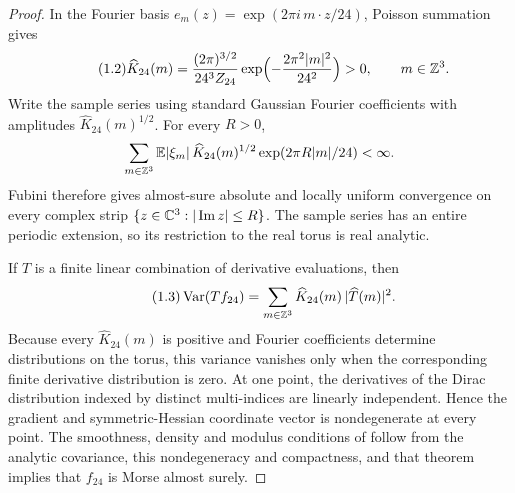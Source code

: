 \begin{proof}
In the Fourier basis $e_m(z)=\exp(2\pi i\,m\cdot z/24)$, Poisson summation gives
\begin{equation}\tag{1.2}\label{eq:Khat}
\widehat K_{24}(m)=\frac{(2\pi)^{3/2}}{24^3Z_{24}}\exp\Bigl(-\frac{2\pi^2|m|^2}{24^2}\Bigr)>0,\qquad m\in\mathbb Z^3.
\end{equation}
Write the sample series using standard Gaussian Fourier coefficients with amplitudes $\widehat K_{24}(m)^{1/2}$. For every $R>0$,
\[
\sum_{m\in\mathbb Z^3}\mathbb E|\xi_m|\,\widehat K_{24}(m)^{1/2}\exp(2\pi R|m|/24)<\infty .
\]
Fubini therefore gives almost-sure absolute and locally uniform convergence on every complex strip $\{z\in\mathbb C^3:|\operatorname{Im}z|\le R\}$. The sample series has an entire periodic extension, so its restriction to the real torus is real analytic.

If $T$ is a finite linear combination of derivative evaluations, then
\begin{equation}\tag{1.3}\label{eq:VarT}
\operatorname{Var}(Tf_{24})=\sum_{m\in\mathbb Z^3}\widehat K_{24}(m)\,|\widehat T(m)|^2 .
\end{equation}
Because every $\widehat K_{24}(m)$ is positive and Fourier coefficients determine distributions on the torus, this variance vanishes only when the corresponding finite derivative distribution is zero. At one point, the derivatives of the Dirac distribution indexed by distinct multi-indices are linearly independent. Hence the gradient and symmetric-Hessian coordinate vector is nondegenerate at every point. The smoothness, density and modulus conditions of \cite[Theorem~11.3.4]{AdlerTaylor} follow from the analytic covariance, this nondegeneracy and compactness, and that theorem implies that $f_{24}$ is Morse almost surely.


\end{proof}
